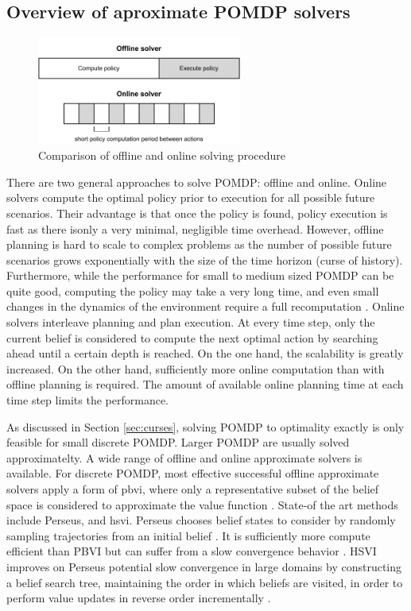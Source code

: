 \subsection{Overview of aproximate POMDP solvers}

\begin{figure}[htbp]
    \centering
    \includegraphics[width=0.6\textwidth]{figures/online-offline.pdf}
    \caption{Comparison of offline and online solving procedure}
\end{figure}

\noindent
There are two general approaches to solve POMDP: offline and online. Online solvers compute the optimal policy prior to execution for all possible future scenarios. Their advantage is that once the policy is found, policy execution is fast as there isonly a very minimal, negligible time overhead. However, offline planning is hard to scale to complex problems as the number of possible future scenarios grows exponentially with the size of the time horizon (curse of history). Furthermore, while the performance for small to medium sized POMDP can be quite good, computing the policy may take a very long time, and even small changes in the dynamics of the environment require a full recomputation \parencite{online_pomdp}. Online solvers interleave planning and plan execution. At every time step, only the current belief is considered to compute the next optimal action by searching ahead until a certain depth is reached. On the one hand, the scalability is greatly increased. On the other hand, sufficiently more online computation than with offline planning is required. The amount of available online planning time at each time step limits the performance. 

As discussed in Section \ref{sec:curses}, solving POMDP to optimality exactly is only feasible for small discrete POMDP. Larger POMDP are usually solved approximatelty. A wide range of offline and online approximate solvers is available. For discrete POMDP, most effective successful offline approximate solvers apply a form of \gls{pbvi}, where only a representative subset of the belief space is considered to approximate the value function \parencite{pomdp-point-based-value}. State-of the art methods include Perseus, and \gls{hsvi}. Perseus chooses belief states to consider by randomly sampling trajectories from an initial belief \parencite{pomdp_perseus}. It is sufficiently more compute efficient than PBVI but can suffer from a slow convergence behavior \parencite{pbvi-survey}. HSVI improves on Perseus potential slow convergence in large domains by constructing a belief search tree, maintaining the order in which beliefs are visited, in order to perform value updates in reverse order incrementally \parencite{solver_hsvi}.

